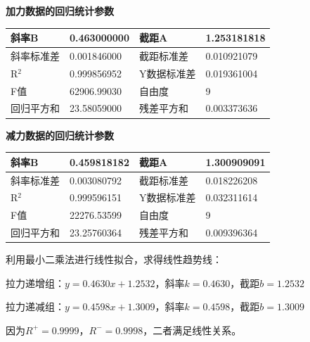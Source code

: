 \documentclass[12pt,a4paper,fontset=windows]{ctexart}
\begin{document}
\vspace{-0.3cm}
\noindent
\scriptsize
\setlength{\tabcolsep}{2pt}
\begin{minipage}[t]{0.495\textwidth}
    \centering
    \textbf{加力数据的回归统计参数}\\[3pt]
    \renewcommand{\arraystretch}{1.25}
    \begin{tabular}{|C{1.7cm}|C{1.9cm}|C{1.7cm}|C{1.9cm}|}
        \hline
        斜率B & 0.463000000 & 截距A & 1.253181818 \\
        \hline
        斜率标准差 & 0.001846000 & 截距标准差 & 0.010921079 \\
        \hline
        R$^2$ & 0.999856952 & Y数据标准差 & 0.019361004 \\
        \hline
        F值 & 62906.99030 & 自由度 & 9 \\
        \hline
        回归平方和 & 23.58059000 & 残差平方和 & 0.003373636 \\
        \hline
    \end{tabular}
\end{minipage}\hfill
\begin{minipage}[t]{0.495\textwidth}
    \centering
    \textbf{减力数据的回归统计参数}\\[3pt]
    \renewcommand{\arraystretch}{1.25}
    \begin{tabular}{|C{1.7cm}|C{1.9cm}|C{1.7cm}|C{1.9cm}|}
        \hline
        斜率B & 0.459818182 & 截距A & 1.300909091 \\
        \hline
        斜率标准差 & 0.003080792 & 截距标准差 & 0.018226208 \\
        \hline
        R$^2$ & 0.999596151 & Y数据标准差 & 0.032311614 \\
        \hline
        F值 & 22276.53599 & 自由度 & 9 \\
        \hline
        回归平方和 & 23.25760364 & 残差平方和 & 0.009396364 \\
        \hline
    \end{tabular}
\end{minipage}
\normalsize
\setlength{\tabcolsep}{4pt}

\vspace{0.4cm}
利用最小二乘法进行线性拟合，求得线性趋势线：

拉力递增组：$y=0.4630x+1.2532$，斜率$k=0.4630$，截距$b=1.2532$

拉力递减组：$y=0.4598x+1.3009$，斜率$k=0.4598$，截距$b=1.3009$

因为$R^{+}=0.9999$，$R^{-}=0.9998$，二者满足线性关系。
\end{document}
